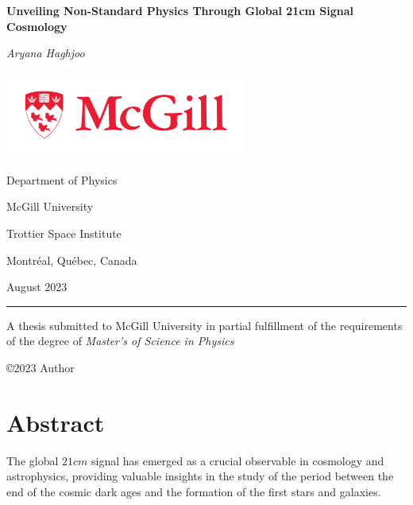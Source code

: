 \documentclass[12pt, TexShade, letterpaper]{report}
\author{\textcopyright Author, August, 2020}
\date{}
\renewcommand{\chaptermark}[1]{\markboth{#1}{}} %
\begin{document}
\begin{titlepage}
		\begin{center}
			\vspace*{0.5cm}

			\LARGE
			\textbf{Unveiling Non-Standard Physics Through Global 21cm Signal Cosmology}
			\vspace{0.5cm}
			
			\textit{Aryana Haghjoo}
			
			\vspace{0.5cm}
			
			\includegraphics[width=0.6\textwidth]{McGill_logo.png}
			
			\vspace{0.1cm}
			
			\Large
			Department of Physics
			
			\vspace{-5mm}
			McGill University
			
			\vspace{-5mm}
			Trottier Space Institute
			
			\vspace{-5mm}
			Montr\'eal, Qu\'ebec, Canada
			
			\vspace{5mm}
			August 2023
			\small
			\vspace{0.5cm}
			{\color{red} \hrule height 0.75mm}
			
			\vspace{0.2cm}
			
			A thesis submitted to McGill University in partial fulfillment of the requirements of the degree of
			\emph{Master's of Science in Physics}
		
			\copyright\hspace{0.5mm}2023 Author
			
		\end{center}
	\end{titlepage}
\setlength{\voffset}{2cm}
\renewcommand{\chaptermark}[1]{%
	\markboth{\thechapter.\ #1}{}}
\chapter*{Abstract}
	\label{chap:engAbstract}
The global $21cm$ signal has emerged as a crucial observable in cosmology and astrophysics, providing valuable insights in the study of the period between the end of the cosmic dark ages and the formation of the first stars and galaxies.\par
\end{document}

